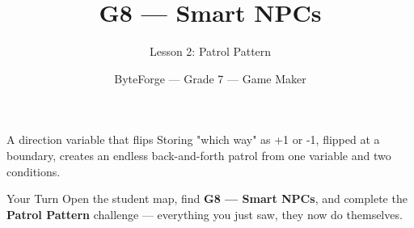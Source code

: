 \documentclass[aspectratio=169]{beamer}
\title{G8 — Smart NPCs}
\subtitle{Lesson 2: Patrol Pattern}
\author{ByteForge --- Grade 7 --- Game Maker}
\date{}
\begin{document}
\begin{frame}
    \titlepage
\end{frame}

\begin{frame}{A direction variable that flips}
    \Large
    Storing "which way" as +1 or -1, flipped at a boundary, creates an endless back-and-forth patrol from one variable and two conditions.

    \begin{center}
    \end{center}
\end{frame}

\begin{frame}{Your Turn}
    \Large
    Open the student map, find \textbf{G8 — Smart NPCs}, and complete
    the \textbf{Patrol Pattern} challenge --- everything you just saw, they now do themselves.
\end{frame}
\end{document}
